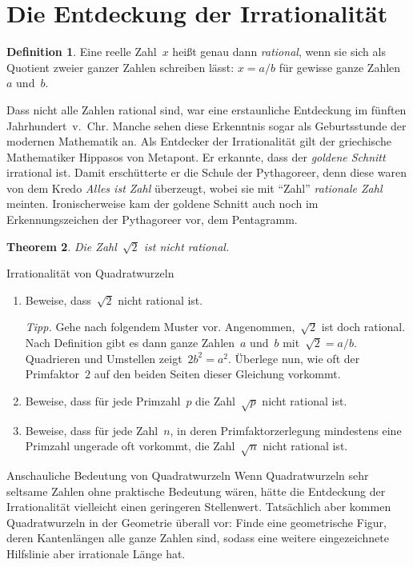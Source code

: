 \documentclass[twoside]{../zirkelblatt1415}
\theoremstyle{definition}
\newtheorem{defn}{Definition}[section]
\theoremstyle{plain}
\newtheorem{thm}[defn]{Theorem}
\theoremstyle{remark}
\begin{document}
\section{Die Entdeckung der Irrationalität}

\begin{defn}Eine reelle Zahl~$x$ heißt genau dann \emph{rational}, wenn sie
sich als Quotient zweier ganzer Zahlen schreiben lässt: $x = a/b$ für gewisse
ganze Zahlen~$a$ und~$b$.\end{defn}

Dass nicht alle Zahlen rational sind, war eine erstaunliche Entdeckung im
fünften Jahrhundert~v.~Chr. Manche sehen diese Erkenntnis sogar als
Geburtsstunde der modernen Mathematik an. Als Entdecker der
Irrationalität gilt der griechische Mathematiker Hippasos von Metapont. Er
erkannte, dass der \emph{goldene Schnitt} irrational ist. Damit erschütterte er
die Schule der Pythagoreer, denn diese waren von dem Kredo \emph{Alles ist
Zahl} überzeugt, wobei sie mit "`Zahl"' \emph{rationale Zahl} meinten.
Ironischerweise kam der goldene Schnitt auch noch im Erkennungszeichen der
Pythagoreer vor, dem Pentagramm.

\begin{thm}Die Zahl~$\sqrt{2}$ ist nicht rational.\end{thm}

\begin{aufgabe}{Irrationalität von Quadratwurzeln}
\begin{enumerate}
\item Beweise, dass~$\sqrt{2}$ nicht rational ist.

\emph{Tipp.} Gehe nach folgendem Muster vor. Angenommen,~$\sqrt{2}$ ist doch
rational. Nach Definition gibt es dann ganze Zahlen~$a$ und~$b$ mit~$\sqrt{2} =
a/b$. Quadrieren und Umstellen zeigt~$2 b^2 = a^2$. Überlege nun, wie oft der
Primfaktor~$2$ auf den beiden Seiten dieser Gleichung vorkommt.

\item Beweise, dass für jede Primzahl~$p$ die Zahl~$\sqrt{p}$ nicht rational
ist.

\item Beweise, dass für jede Zahl~$n$, in deren Primfaktorzerlegung mindestens
eine Primzahl ungerade oft vorkommt, die Zahl~$\sqrt{n}$ nicht rational ist.
\end{enumerate}\fixlistspacing
\end{aufgabe}

\begin{aufgabe}{Anschauliche Bedeutung von Quadratwurzeln}
Wenn Quadratwurzeln sehr seltsame Zahlen ohne praktische Bedeutung wären,
hätte die Entdeckung der Irrationalität vielleicht einen geringeren
Stellenwert. Tatsächlich aber kommen Quadratwurzeln in der
Geometrie überall vor: Finde eine geometrische Figur, deren Kantenlängen alle
ganze Zahlen sind, sodass eine weitere eingezeichnete Hilfslinie aber
irrationale Länge hat.
\end{aufgabe}
\end{document}
